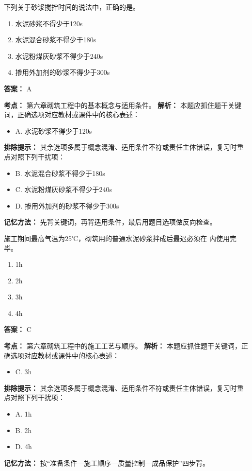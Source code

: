 \documentclass[UTF8,fontset=fandol,11pt]{ctexart}
\begin{document}
\begin{quizbox}[title={第 7 题}]
下列关于砂浆搅拌时间的说法中，正确的是。\\
\begin{enumerate}[label=\Alph*.]
\item 水泥砂浆不得少于120s
\item 水泥混合砂浆不得少于180s
\item 水泥粉煤灰砂浆不得少于240s
\item 掺用外加剂的砂浆不得少于300s
\end{enumerate}
\textbf{答案：} A
\vspace{0.25em}
\begin{answerbox}[title={考点解析}]
\textbf{考点：} 第六章砌筑工程中的基本概念与适用条件。
\textbf{解析：} 本题应抓住题干关键词，正确选项对应教材或课件中的核心表述：
\begin{itemize}
\item A. 水泥砂浆不得少于120s
\end{itemize}
\textbf{排除提示：} 其余选项多属于概念混淆、适用条件不符或责任主体错误，复习时重点对照下列干扰项：
\begin{itemize}
\item B. 水泥混合砂浆不得少于180s
\item C. 水泥粉煤灰砂浆不得少于240s
\item D. 掺用外加剂的砂浆不得少于300s
\end{itemize}
\textbf{记忆方法：} 先背关键词，再背适用条件，最后用题目选项做反向检查。
\end{answerbox}
\end{quizbox}

\begin{quizbox}[title={第 8 题}]
施工期间最高气温为25℃，砌筑用的普通水泥砂浆拌成后最迟必须在 内使用完毕。\\
\begin{enumerate}[label=\Alph*.]
\item 1h
\item 2h
\item 3h
\item 4h
\end{enumerate}
\textbf{答案：} C
\vspace{0.25em}
\begin{answerbox}[title={考点解析}]
\textbf{考点：} 第六章砌筑工程中的施工工艺与顺序。
\textbf{解析：} 本题应抓住题干关键词，正确选项对应教材或课件中的核心表述：
\begin{itemize}
\item C. 3h
\end{itemize}
\textbf{排除提示：} 其余选项多属于概念混淆、适用条件不符或责任主体错误，复习时重点对照下列干扰项：
\begin{itemize}
\item A. 1h
\item B. 2h
\item D. 4h
\end{itemize}
\textbf{记忆方法：} 按“准备条件—施工顺序—质量控制—成品保护”四步背。
\end{answerbox}
\end{quizbox}
\end{document}
